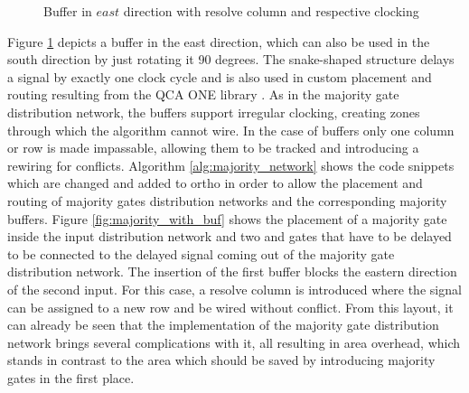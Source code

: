 \begin{figure}
	\caption{Buffer in $east$ direction with resolve column and respective clocking}\label{fig:QCA_buf}
\end{figure}

Figure \ref{fig:QCA_buf} depicts a buffer in the east direction, which can also be used in the south direction by just rotating it 90 degrees. The snake-shaped structure delays a signal by exactly one clock cycle and is also used in custom placement and routing resulting from the QCA ONE library \cite{QCA_scl}. As in the majority gate distribution network, the buffers support irregular clocking, creating zones through which the algorithm cannot wire. In the case of buffers only one column or row is made impassable, allowing them to be tracked and introducing a rewiring for conflicts. Algorithm \ref{alg:majority_network} shows the code snippets which are changed and added to ortho in order to allow the placement and routing of majority gates distribution networks and the corresponding majority buffers. Figure \ref{fig:majority_with_buf} shows the placement of a majority gate inside the input distribution network and two and gates that have to be delayed to be connected to the delayed signal coming out of the majority gate distribution network. The insertion of the first buffer blocks the eastern direction of the second input. For this case, a resolve column is introduced where the signal can be assigned to a new row and be wired without conflict. From this layout, it can already be seen that the implementation of the majority gate distribution network brings several complications with it, all resulting in area overhead, which stands in contrast to the area which should be saved by introducing majority gates in the first place.

